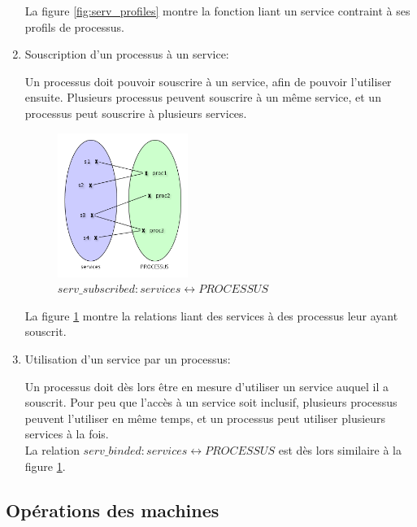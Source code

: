 \documentclass[french, titlepage, 10pt, a4paper]{article}
\begin{document}
\begin{enumerate}
    La figure \ref{fig:serv_profiles} montre la fonction liant un service
    contraint à ses profils de processus.

  \item Souscription d'un processus à un service:

    Un processus doit pouvoir souscrire à un service, afin de pouvoir l'utiliser
    ensuite.
    Plusieurs processus peuvent souscrire à un même service, et un processus
    peut souscrire à plusieurs services.

    \begin{figure}[htb]
      \centering
      \includegraphics[width=0.4\textwidth]{serv_proc.png}
      \caption{$serv\_subscribed: services \rel PROCESSUS$}
      \label{fig:serv_subscribed}
    \end{figure}

    La figure \ref{fig:serv_subscribed} montre la relations liant des services
    à des processus leur ayant souscrit.

  \item Utilisation d'un service par un processus:

    Un processus doit dès lors être en mesure d'utiliser un service auquel il a
    souscrit.
    Pour peu que l'accès à un service soit inclusif, plusieurs processus peuvent
    l'utiliser en même temps, et un processus peut utiliser plusieurs services à
    la fois.\\

    La relation $serv\_binded: services \rel PROCESSUS$ est
    dès lors similaire à la figure \ref{fig:serv_subscribed}.

\end{enumerate}

\subsection{Opérations des machines}
\end{document}
